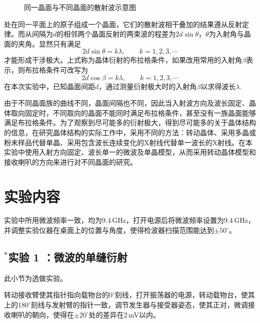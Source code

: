 \documentclass[UTF8]{article}
\theoremstyle{MyLineTheoremStyle} %
\theoremstyle{MyBlockTheoremStyle} %
\theoremstyle{MySubsubsectionStyle} %
\begin{document}
\begin{figure}[h]
    \caption{同一晶面与不同晶面的散射波示意图}
    \label{fig-scatt}
\end{figure}

处在同一平面上的原子组成一个晶面，它们的散射波相干叠加的结果遵从反射定律。而从间隔为$ d $的相邻两个晶面反射的两束波的程差为$ 2d\sin\theta $，$ \theta $为入射角与晶面的夹角。显然只有满足
\[2d\sin\theta=k\lambda,\qquad k=1,2,3,\cdots\]
才能形成干涉极大。上式称为晶体衍射的布拉格条件，如果改用常用的入射角$ \beta $表示，则布拉格条件可改写为
\[2d\cos\beta=k\lambda,\qquad k=1,2,3,\cdots\]
在本次实验中，已知晶面间距$ d $，通过测量衍射极大时的入射角$ \beta $以求得波长$\lambda$.

由于不同晶面族的曲线不同，晶面间隔也不同，因此当入射波方向及波长固定、晶体取向固定时，不同取向的晶面不能同时满足布拉格条件，甚至没有一族晶面能够满足布拉格条件。为了观察到尽可能多的衍射极大，得到尽可能多的关于晶体结构的信息，在研究晶体结构的实际工作中，采用不同的方法：转动晶体、采用多晶或粉末样品代替单晶、采用包含波长连续变化的X射线代替单一波长的X射线。在本实验中使用入射方向固定、波长单一的微波及单晶模型，从而采用转动晶体模型和接收喇叭的方向来进行对不同晶面的研究。


\section{实验内容}
实验中所用微波频率一致，均为9.4\,GHz，打开电源后将微波频率设置为9.4\,GHz，并调整实验仪器在桌面上的位置与角度，使得检波器扫描范围能达到$ \pm50^\circ $。

\subsection{$^*$实验 1 ：微波的单缝衍射}
此小节为选做实验。


转动接收臂使其指针指向载物台的$ 0^\circ $刻线，打开振荡器的电源，转动载物台，使其上的$ 180^\circ $刻线与发射臂的指针一致，调节发生器与接受器姿态，使其正对，微调接收喇叭的朝向，使得在$ \pm20^\circ $处的差异在2\,mV以内。
\end{document}
